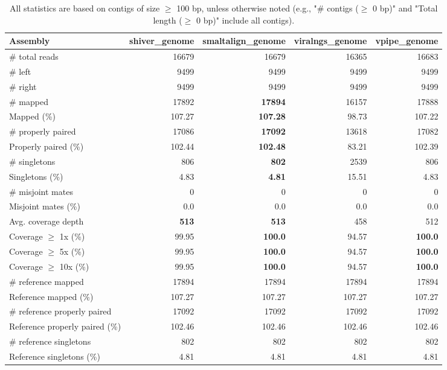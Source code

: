 \documentclass[12pt,a4paper]{article}
\begin{document}
\begin{table}[ht]
\begin{center}
\caption{All statistics are based on contigs of size $\geq$ 100 bp, unless otherwise noted (e.g., "\# contigs ($\geq$ 0 bp)" and "Total length ($\geq$ 0 bp)" include all contigs).}
\begin{tabular}{|l*{4}{|r}|}
\hline
Assembly & shiver\_genome & smaltalign\_genome & viralngs\_genome & vpipe\_genome \\ \hline
\# total reads & 16679 & 16679 & 16365 & 16683 \\ \hline
\# left & 9499 & 9499 & 9499 & 9499 \\ \hline
\# right & 9499 & 9499 & 9499 & 9499 \\ \hline
\# mapped & 17892 & {\bf 17894} & 16157 & 17888 \\ \hline
Mapped (\%) & 107.27 & {\bf 107.28} & 98.73 & 107.22 \\ \hline
\# properly paired & 17086 & {\bf 17092} & 13618 & 17082 \\ \hline
Properly paired (\%) & 102.44 & {\bf 102.48} & 83.21 & 102.39 \\ \hline
\# singletons & 806 & {\bf 802} & 2539 & 806 \\ \hline
Singletons (\%) & 4.83 & {\bf 4.81} & 15.51 & 4.83 \\ \hline
\# misjoint mates & 0 & 0 & 0 & 0 \\ \hline
Misjoint mates (\%) & 0.0 & 0.0 & 0.0 & 0.0 \\ \hline
Avg. coverage depth & {\bf 513} & {\bf 513} & 458 & 512 \\ \hline
Coverage $\geq$ 1x (\%) & 99.95 & {\bf 100.0} & 94.57 & {\bf 100.0} \\ \hline
Coverage $\geq$ 5x (\%) & 99.95 & {\bf 100.0} & 94.57 & {\bf 100.0} \\ \hline
Coverage $\geq$ 10x (\%) & 99.95 & {\bf 100.0} & 94.57 & {\bf 100.0} \\ \hline
\# reference mapped & 17894 & 17894 & 17894 & 17894 \\ \hline
Reference mapped (\%) & 107.27 & 107.27 & 107.27 & 107.27 \\ \hline
\# reference properly paired & 17092 & 17092 & 17092 & 17092 \\ \hline
Reference properly paired (\%) & 102.46 & 102.46 & 102.46 & 102.46 \\ \hline
\# reference singletons & 802 & 802 & 802 & 802 \\ \hline
Reference singletons (\%) & 4.81 & 4.81 & 4.81 & 4.81 \\ \hline

\end{tabular}
\end{center}
\end{table}
\end{document}
